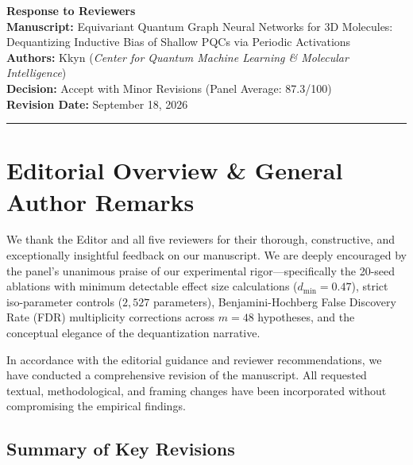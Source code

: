 \documentclass[10pt,letterpaper]{article}
\begin{document}
\begin{center}
    {\Large \textbf{Response to Reviewers}}\\[0.8em]
    {\large \textbf{Manuscript:}} Equivariant Quantum Graph Neural Networks for 3D Molecules:\\Dequantizing Inductive Bias of Shallow PQCs via Periodic Activations\\[0.4em]
    {\textbf{Authors:}} Kkyn (\textit{Center for Quantum Machine Learning \& Molecular Intelligence})\\[0.2em]
    {\textbf{Decision:}} Accept with Minor Revisions (Panel Average: 87.3/100)\\[0.2em]
    {\textbf{Revision Date:}} September 18, 2026
\end{center}

\vspace{1em}
\hrule
\vspace{1em}

\section*{Editorial Overview \& General Author Remarks}

We thank the Editor and all five reviewers for their thorough, constructive, and exceptionally insightful feedback on our manuscript. We are deeply encouraged by the panel's unanimous praise of our experimental rigor---specifically the 20-seed ablations with minimum detectable effect size calculations ($d_{\min} = 0.47$), strict iso-parameter controls ($2{,}527$ parameters), Benjamini-Hochberg False Discovery Rate (FDR) multiplicity corrections across $m=48$ hypotheses, and the conceptual elegance of the dequantization narrative.

In accordance with the editorial guidance and reviewer recommendations, we have conducted a comprehensive revision of the manuscript. All requested textual, methodological, and framing changes have been incorporated without compromising the empirical findings.

\subsection*{Summary of Key Revisions}
\end{document}
